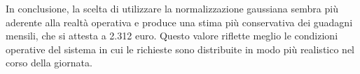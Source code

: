\documentclass[a4paper, 12pt]{article}
\newcommand{\makesub}[1]{%
  \saveexpandmode\noexpandarg
  \StrSubstitute{#1}{\_}{_}[\temp]%
  \restoreexpandmode%
}
\newcommand{\target}[1]{%
  \makesub{#1}%
  \hypertarget{\temp}{}%
}
\begin{document}
In conclusione, la scelta di utilizzare la normalizzazione gaussiana sembra più aderente alla realtà operativa e produce una stima più conservativa dei guadagni mensili, che si attesta a 2.312 euro. Questo valore riflette meglio le condizioni operative del sistema in cui le richieste sono distribuite in modo più realistico nel corso della giornata.



%
%
%
%
%
%
%
%
%
%
%
%
%
%
%
\end{document}
